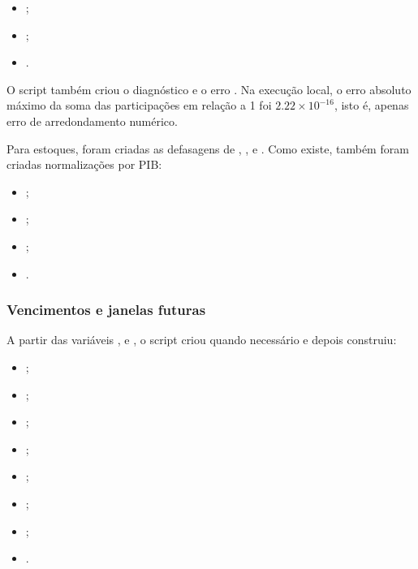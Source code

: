 \documentclass[12pt,a4paper]{article}
\begin{document}
\begin{itemize}[leftmargin=1.2cm]
    \item {};
    \item {};
    \item {}.
\end{itemize}

O script também criou o diagnóstico  e o erro
. Na execução local, o erro absoluto máximo da soma das
participações em relação a 1 foi \(2.22 \times 10^{-16}\), isto é, apenas erro de
arredondamento numérico.

Para estoques, foram criadas as defasagens de ,
,  e . Como
 existe, também foram criadas normalizações por PIB:

\begin{itemize}[leftmargin=1.2cm]
    \item {};
    \item {};
    \item {};
    \item {}.
\end{itemize}

\subsubsection{Vencimentos e janelas futuras}

A partir das variáveis ,  e , o script
criou  quando necessário e depois construiu:

\begin{itemize}[leftmargin=1.2cm]
    \item {};
    \item {};
    \item {};
    \item {};
    \item {};
    \item {};
    \item {};
    \item {}.
\end{itemize}
\end{document}
